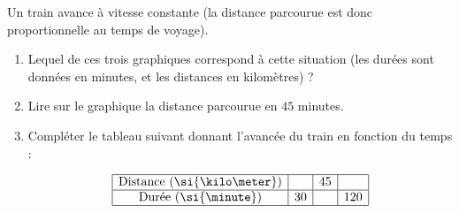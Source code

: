 
\begin{exercice}\label{exo2smath-0096}

    Un train avance à vitesse constante (la distance parcourue est donc proportionnelle au temps de voyage). 
    
    \begin{enumerate}
        \item
            
    Lequel de ces trois graphiques correspond à cette situation (les durées sont données en minutes, et les distances en kilomètres) ?

   
   
   

 \item
     Lire sur le graphique la distance parcourue en \( 45\) minutes.
 \item

Compléter le tableau suivant donnant l'avancée du train en fonction du temps :

\begin{equation*}
    \begin{array}[]{|c|c|c|c|}
        \hline
        \text{Distance (\si{\kilo\meter})}&&45&\\
          \hline
          \text{Durée (\si{\minute})}&30&&120\\
          \hline
    \end{array}
\end{equation*}

    \end{enumerate}

\end{exercice}
